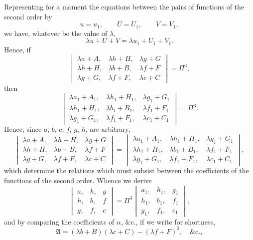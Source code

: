 \documentclass[11pt,a4paper]{book}
\begin{document}
Representing for a moment the equations between the pairs of functions of the second order by
\[
u = u_{1}, \qquad U = U_{1}, \qquad V = V_{1},
\]
we have, whatever be the value of $\lambda$,
\[
\lambda u + U + V = \lambda u_{1} + U_{1} + V_{1}.
\]
Hence, if
\[
\begin{vmatrix}
\lambda a + A, & \lambda h + H, & \lambda g + G \\
\lambda h + H, & \lambda b + B, & \lambda f + F \\
\lambda g + G, & \lambda f + F, & \lambda c + C
\end{vmatrix}
= \Pi^{3},
\]
then
\[
\begin{vmatrix}
\lambda a_{1} + A_{1}, & \lambda h_{1} + H_{1}, & \lambda g_{1} + G_{1} \\
\lambda h_{1} + H_{1}, & \lambda b_{1} + B_{1}, & \lambda f_{1} + F_{1} \\
\lambda g_{1} + G_{1}, & \lambda f_{1} + F_{1}, & \lambda c_{1} + C_{1}
\end{vmatrix}
= \Pi^{3}.
\]
Hence, since $a$, $b$, $c$, $f$, $g$, $h$, are arbitrary,
\[
\begin{vmatrix}
\lambda a + A, & \lambda h + H, & \lambda g + G \\
\lambda h + H, & \lambda b + B, & \lambda f + F \\
\lambda g + G, & \lambda f + F, & \lambda c + C
\end{vmatrix}
=
\begin{vmatrix}
\lambda a_{1} + A_{1}, & \lambda h_{1} + H_{1}, & \lambda g_{1} + G_{1} \\
\lambda h_{1} + H_{1}, & \lambda b_{1} + B_{1}, & \lambda f_{1} + F_{1} \\
\lambda g_{1} + G_{1}, & \lambda f_{1} + F_{1}, & \lambda c_{1} + C_{1}
\end{vmatrix},
\]
which determine the relations which must subsist between the coefficients of the functions of the second order. Whence we derive
\[
\begin{vmatrix}
a, & h, & g \\
h, & b, & f \\
g, & f, & c
\end{vmatrix}
= \Pi^{3}
\begin{vmatrix}
a_{1}, & h_{1}, & g_{1} \\
h_{1}, & b_{1}, & f_{1} \\
g_{1}, & f_{1}, & c_{1}
\end{vmatrix},
\]
and by comparing the coefficients of $\alpha$, \&c., if we write for shortness,
\[
\mathfrak{A} = (\lambda b + B)(\lambda c + C) - (\lambda f + F)^{2}, \quad \&\text{c.},
\]
\end{document}
